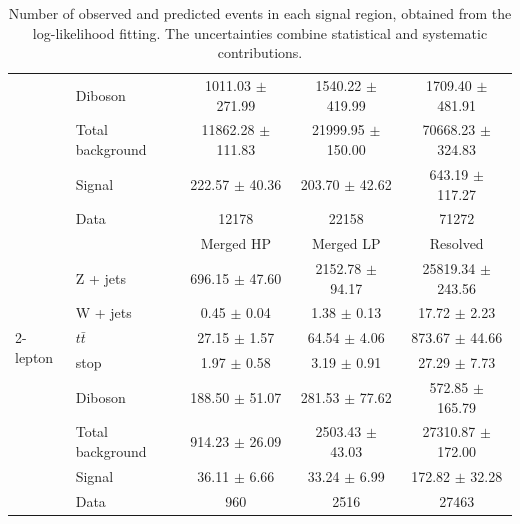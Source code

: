 \begin{table}[htbp]
\begin{center}
\begin{tabular}{| l | l | c | c | c |}
                   & Diboson      &  1011.03 $\pm$ 271.99          &   1540.22 $\pm$ 419.99         & 1709.40 $\pm$ 481.91\\ \cline{2-5}
                   & Total background    & 11862.28 $\pm$ 111.83            &   21999.95 $\pm$ 150.00         & 70668.23 $\pm$ 324.83\\ \cline{2-5}
                   & Signal       & 222.57 $\pm$ 40.36           & 203.70 $\pm$ 42.62           &643.19 $\pm$ 117.27\\ \cline{2-5}
                   & Data         & 12178           & 22158           &71272\\ \hline \hline
\multirow{7}{*}{2-lepton} &     & Merged HP  & Merged LP               & Resolved  \\ \cline{2-5}
        & Z + jets    &  696.15 $\pm$ 47.60  & 2152.78 $\pm$ 94.17     & 25819.34 $\pm$ 243.56\\ 
        & W + jets    &  0.45 $\pm$ 0.04     & 1.38 $\pm$ 0.13         & 17.72 $\pm$ 2.23\\  
        & $t\bar{t}$  &  27.15 $\pm$ 1.57    & 64.54 $\pm$ 4.06        & 873.67 $\pm$ 44.66\\ 
        & stop        &  1.97 $\pm$ 0.58     & 3.19 $\pm$ 0.91         & 27.29 $\pm$ 7.73\\ 
        & Diboson     &  188.50 $\pm$ 51.07  & 281.53 $\pm$ 77.62      & 572.85 $\pm$ 165.79\\ \cline{2-5}
        & Total background   &  914.23 $\pm$ 26.09  & 2503.43 $\pm$ 43.03  & 27310.87 $\pm$ 172.00\\ \cline{2-5}
        & Signal      &  36.11 $\pm$ 6.66    & 33.24 $\pm$ 6.99        & 172.82 $\pm$ 32.28\\ \cline{2-5}
        & Data        &  960                 & 2516                    & 27463\\ \hline 
\end{tabular}
\caption{\label{tab:postyields} Number of observed and predicted events in each signal region, obtained from the log-likelihood fitting. The uncertainties combine statistical and systematic contributions. }
\end{center}
\end{table}

